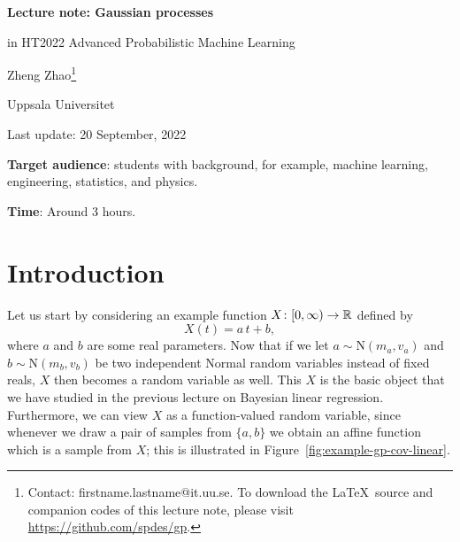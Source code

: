 \documentclass[]{article}
\begin{document}
\begin{titlepage}
	\let\newpage\relax
	
	\begin{center}
		\vspace*{0.1cm}
		
		\Large{\textbf{Lecture note: Gaussian processes}}
		
		\vspace{0.2em}
		
		\normalsize{in HT2022 Advanced Probabilistic Machine Learning}
		
		\vspace{1cm}
		
		Zheng Zhao\footnote{Contact: firstname.lastname@it.uu.se. To download the \LaTeX~source and companion codes of this lecture note, please visit \url{https://github.com/spdes/gp}.}
		
		\vspace{0.2em}
		
		Uppsala Universitet
		
		\vspace{0.2em}
		
		Last update: 20 September, 2022
	\end{center}
	
	\textbf{Target audience}: students with background, for example, machine learning, engineering, statistics, and physics.
	
	\textbf{Time}: Around 3 hours.
	
	\vspace{0.5cm}
\end{titlepage}



\section{Introduction}
\label{sec:intro}
Let us start by considering an example function $X\colon [0, \infty) \to \mathbb{R}$ defined by
%
\begin{equation}
	X(t) = a \, t + b,
	\label{equ:example-gp-linear-cov}
\end{equation}
%
where $a$ and $b$ are some real parameters. Now that if we let $a \sim \mathrm{N}(m_a, v_a)$ and $b \sim \mathrm{N}(m_b, v_b)$ be two independent Normal random variables instead of fixed reals, $X$ then becomes a random variable as well. This $X$ is the basic object that we have studied in the previous lecture on Bayesian linear regression. Furthermore, we can view $X$ as a function-valued random variable, since whenever we draw a pair of samples from $\lbrace a, b\rbrace$ we obtain an affine function which is a sample from $X$; this is illustrated in Figure~\ref{fig:example-gp-cov-linear}.
\end{document}
